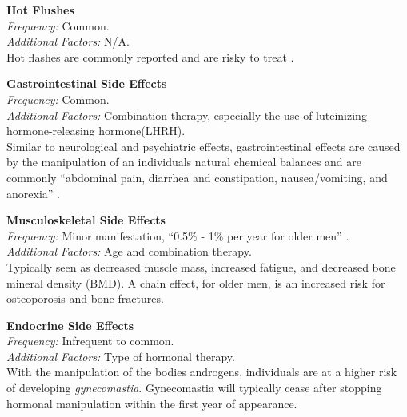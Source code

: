 \documentclass[journal]{vgtc}                %
\begin{document}
                        \textbf{Hot Flushes}
                        \\ \textit{Frequency:} Common.
                        \\ \textit{Additional Factors:} N/A.
                        \\ Hot flashes are commonly reported and are risky to treat \cite{AdverseEvents:2005}.
                        \newline

                        \textbf{Gastrointestinal Side Effects}
                        \\ \textit{Frequency:} Common.
                        \\ \textit{Additional Factors:} Combination therapy, especially the use of luteinizing hormone-releasing hormone(LHRH).
                        \\ Similar to neurological and psychiatric effects, gastrointestinal effects are caused by the manipulation of an individuals natural chemical balances and are commonly ``abdominal pain, diarrhea and constipation, nausea/vomiting, and anorexia'' \cite{AdverseEvents:2005}.
                        \newline

                        \textbf{Musculoskeletal Side Effects}
                        \\ \textit{Frequency:} Minor manifestation, ``0.5\% - 1\% per year for older men'' \cite{AdverseEvents:2005}.
                        \\ \textit{Additional Factors:} Age and combination therapy.
                        \\ Typically seen as decreased muscle mass, increased fatigue, and decreased bone mineral density (BMD).
                        A chain effect, for older men, is an increased risk for osteoporosis and bone fractures. \cite{AdverseEvents:2005}
                        \newline

                        \textbf{Endocrine Side Effects}
                        \\ \textit{Frequency:} Infrequent to common.
                        \\ \textit{Additional Factors:} Type of hormonal therapy.
                        \\ With the manipulation of the bodies androgens, individuals are at a higher risk of developing \textit{gynecomastia}.
                        Gynecomastia will typically cease after stopping hormonal manipulation within the first year of appearance.
                        \newline
\end{document}
